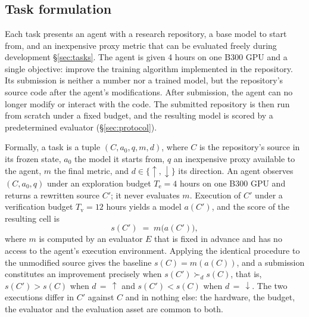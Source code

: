\section{\ai{}}
\label{sec:benchmark}

\subsection{Task formulation}
\label{sec:formulation}

Each task presents an agent with a research repository, a base model to start from, and an inexpensive proxy metric that can be evaluated freely during development \S\ref{sec:tasks}. 
The agent is given 4 hours on one B300 GPU and a single objective: improve the training algorithm implemented in the repository.
Its submission is neither a number nor a trained model, but the repository’s source code after the agent’s modifications. 
After submission, the agent can no longer modify or interact with the code. The submitted repository is then run from scratch under a fixed budget, and the resulting model is scored by a predetermined evaluator (\S\ref{sec:protocol}).

Formally, a task is a tuple $(C, a_0, q, m, d)$, where $C$ is the repository's source in its frozen
state, $a_0$ the model it starts from, $q$ an inexpensive proxy available to the agent, $m$
the final metric, and $d \in \{\uparrow, \downarrow\}$ its direction. An agent observes
$(C, a_0, q)$ under an exploration budget $T_{\mathrm{e}} = 4$ hours on one B300 GPU and returns a
rewritten source $C'$; it never evaluates $m$. Execution of $C'$ under a verification budget
$T_{\mathrm{v}} = 12$ hours yields a model $a(C')$, and the score of the resulting cell is
\begin{equation*}
  s(C') \;=\; m\bigl(a(C')\bigr),
\end{equation*}
where $m$ is computed by an evaluator $E$ that is fixed in advance and has no access to the agent's
execution environment. Applying the identical procedure to the unmodified source gives the baseline
$s(C) = m(a(C))$, and a submission constitutes an improvement precisely when
$s(C') \succ_d s(C)$, that is, $s(C') > s(C)$ when $d\,{=}\,\uparrow$ and $s(C') < s(C)$ when
$d\,{=}\,\downarrow$. The two executions differ in $C'$ against $C$ and in nothing else: the hardware, the budget, the evaluator and the evaluation asset are common to both.


